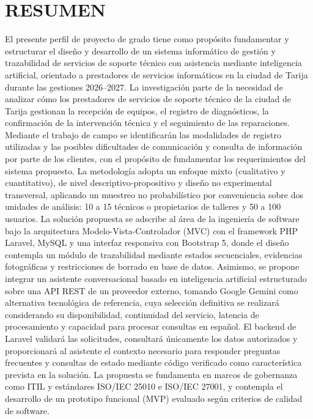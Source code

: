 \chapter*{RESUMEN}

El presente perfil de proyecto de grado tiene como propósito fundamentar y estructurar el diseño y desarrollo de un sistema informático de gestión y trazabilidad de servicios de soporte técnico con asistencia mediante inteligencia artificial, orientado a prestadores de servicios informáticos en la ciudad de Tarija durante las gestiones 2026--2027. La investigación parte de la necesidad de analizar cómo los prestadores de servicios de soporte técnico de la ciudad de Tarija gestionan la recepción de equipos, el registro de diagnósticos, la confirmación de la intervención técnica y el seguimiento de las reparaciones. Mediante el trabajo de campo se identificarán las modalidades de registro utilizadas y las posibles dificultades de comunicación y consulta de información por parte de los clientes, con el propósito de fundamentar los requerimientos del sistema propuesto. La metodología adopta un enfoque mixto (cualitativo y cuantitativo), de nivel descriptivo-propositivo y diseño no experimental transversal, aplicando un muestreo no probabilístico por conveniencia sobre dos unidades de análisis: 10 a 15 técnicos o propietarios de talleres y 50 a 100 usuarios. La solución propuesta se adscribe al área de la ingeniería de software bajo la arquitectura Modelo-Vista-Controlador (MVC) con el framework PHP Laravel, MySQL y una interfaz responsiva con Bootstrap 5, donde el diseño contempla un módulo de trazabilidad mediante estados secuenciales, evidencias fotográficas y restricciones de borrado en base de datos. Asimismo, se propone integrar un asistente conversacional basado en inteligencia artificial estructurado sobre una API REST de un proveedor externo, tomando Google Gemini como alternativa tecnológica de referencia, cuya selección definitiva se realizará considerando su disponibilidad, continuidad del servicio, latencia de procesamiento y capacidad para procesar consultas en español. El backend de Laravel validará las solicitudes, consultará únicamente los datos autorizados y proporcionará al asistente el contexto necesario para responder preguntas frecuentes y consultas de estado mediante código verificado como característica prevista en la solución. La propuesta se fundamenta en marcos de gobernanza como ITIL y estándares ISO/IEC 25010 e ISO/IEC 27001, y contempla el desarrollo de un prototipo funcional (MVP) evaluado según criterios de calidad de software.